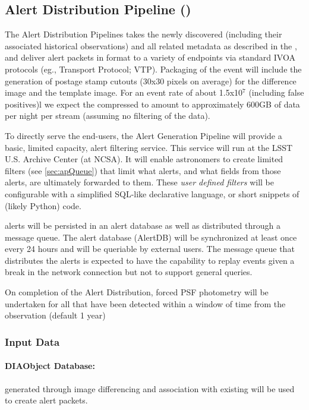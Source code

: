 \clearpage

\subsection{Alert Distribution Pipeline (\wbsAP)}

The Alert Distribution Pipelines takes the newly discovered \DIAObjects (including their associated historical observations) and all related metadata as described in the \DPDD, and deliver alert packets in \VOEvent format to a variety of endpoints via standard IVOA protocols (eg., \VOEvent Transport Protocol; VTP\@). Packaging of the event will include the generation of postage stamp cutouts (30x30 pixels on average) for the difference image and the template image. For an event rate of about 1.5x10$^7$ (including false positives)l we expect the compressed \VOEvents to amount to approximately 600GB of data per night per \VOEvent stream (assuming no filtering of the data). 

To directly serve the end-users, the Alert Generation Pipeline will provide a basic, limited capacity, alert filtering service. This service will run at the LSST U.S. Archive Center (at NCSA). It will enable astronomers to create limited  filters (see  \ref{sec:apQueue}) that limit what alerts, and what fields from those alerts, are ultimately forwarded to them. These \emph{user defined filters} will be configurable with a simplified SQL-like declarative language, or short snippets of (likely Python) code.

\VOEvent alerts will be persisted in an alert database as well as distributed through a message queue. The alert database (AlertDB) will be synchronized at least once every 24 hours and will be queriable by external users. The message queue that distributes the alerts is expected to have the capability  to replay events given a break in the network connection but not to support general queries.

On completion of the Alert Distribution, forced PSF photometry will be undertaken for all \DIAObjects that have been detected within a window of time from the observation (default 1 year)

\subsubsection{Input Data}
\label{sec:apADInput}

\paragraph*{DIAObject Database:} \DIAObjects generated through image differencing and association with existing \DIAObjects will be used to create alert packets.

